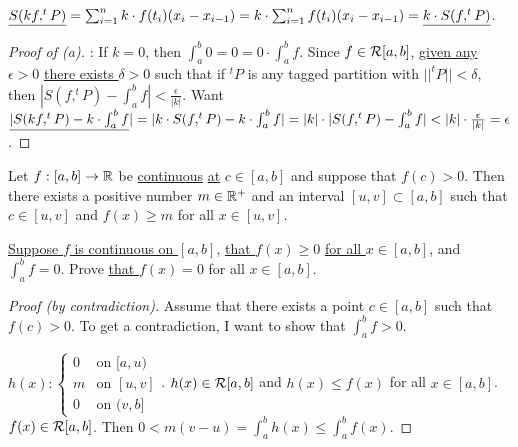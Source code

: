 \documentclass[]{article}
\begin{document}
$\underline{S(kf,^tP)} = \sum_{i=1}^n k\cdot f(t_i)(x_i-x_{i-1}) = k\cdot \sum_{i=1}^n f(t_i)(x_i-x_{i-1}) = \underline{k\cdot S(f,^tP)}$.

\begin{proof}
	[Proof of (a)]: If $k=0$, then $\int_a^b0 =0 = 0\cdot \int_a^b f$. Since $f\in\mathcal{R}[a,b]$, \ul{given any $\epsilon>0$} \ul{there exists $\delta>0$} such that if $^tP$ is any tagged partition with \ul{$||^tP||<\delta$}, then \ul{$|S(f,^tP)-\int_a^b f|<\frac{\epsilon}{|k|}$}.
	Want $\underline{|S(kf,^tP)-k\cdot \int_a^b f}| = |k\cdot S(f,^tP)-k\cdot \int_a^b f| = |k|\cdot |S(f,^tP)-\int_a^b f| < |k|\cdot \frac{\epsilon}{|k|} = \epsilon$.
\end{proof}

\begin{recall}
	[Problem \#1 HW \#5] Let $f:[a,b]\rightarrow\mathbb{R}$ be \ul{continuous} \ul{at} \ul{$c\in[a,b]$} and suppose that \ul{$f(c)>0$}. Then there exists a positive number $m\in\mathbb{R}^+$ and an interval $[u,v] \subset [a,b]$ such that $c\in[u,v]$ and $f(x)\geq m$ for all $x\in[u,v]$.
\end{recall}
\begin{example}
	[\ul{HW \# 6 \#3}] \ul{Suppose $f$ is continuous on $[a,b]$}, \ul{that $f(x)\geq 0$} \ul{for all $x\in[a,b]$}, and $\int_a^b f = 0$. Prove \ul{that $f(x) = 0$} for all $x\in[a,b]$.
		\begin{proof}
			[Proof (by contradiction)] Assume that there exists a point \ul{$c\in[a,b]$} such that $f(c)>0$. To get a contradiction, I want to show that $\int_a^b f>0$.
			
			$h(x) : \begin{cases} 0 & \text{on }[a,u) \\ m & \text{on }[u,v] \\ 0 & \text{on }(v,b] \end{cases}$. $h(x)\in\mathcal{R}[a,b]$ and $h(x)\leq f(x)$ for all $x\in[a,b]$. $f(x)\in\mathcal{R}[a,b]$. Then $0< m(v-u) = \int_a^b h(x) \leq \int_a^b f(x)$.
		\end{proof}
\end{example}
\end{document}
